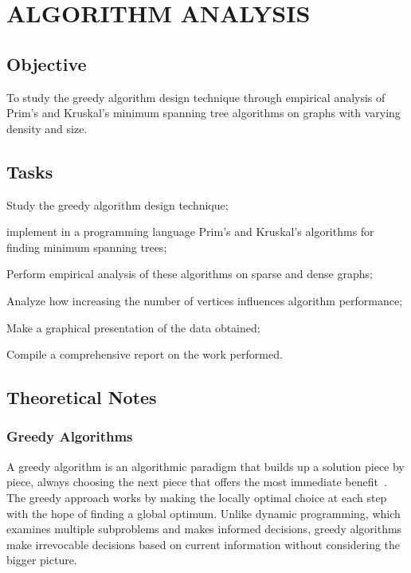 \documentclass[12pt, a4paper]{report}
\begin{document}
\chapter{ALGORITHM ANALYSIS}

\section{Objective}

To study the greedy algorithm design technique through empirical analysis of Prim's and Kruskal's minimum spanning tree algorithms on graphs with varying density and size.

\section{Tasks}

\begin{dashenum}
  \item Study the greedy algorithm design technique;
  \item implement in a programming language Prim's and Kruskal's algorithms for finding minimum spanning trees;
  \item Perform empirical analysis of these algorithms on sparse and dense graphs;
  \item Analyze how increasing the number of vertices influences algorithm performance;
  \item Make a graphical presentation of the data obtained;
  \item Compile a comprehensive report on the work performed.
\end{dashenum}

\section{Theoretical Notes}

\subsection{Greedy Algorithms}

A greedy algorithm is an algorithmic paradigm that builds up a solution piece by piece, always choosing the next piece that offers the most immediate benefit~\cite{ref:greedy}. The greedy approach works by making the locally optimal choice at each step with the hope of finding a global optimum. Unlike dynamic programming, which examines multiple subproblems and makes informed decisions, greedy algorithms make irrevocable decisions based on current information without considering the bigger picture.
\end{document}

